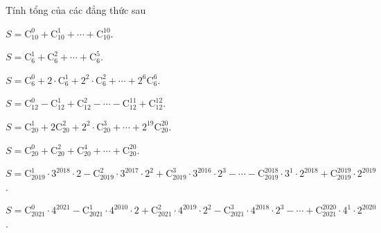 \begin{bt}%
	Tính  tổng của các đẳng thức sau
	\begin{listEX}
		 \item $S=\mathrm{C}_{10}^0+\mathrm{C}_{10}^1+\cdots+\mathrm{C}_{10}^{10}$.
		\item $S=\mathrm{C}_6^1+\mathrm{C}_6^2+\cdots+\mathrm{C}_6^5$. 
		\item $S=\mathrm{C}_6^0+2  \cdot \mathrm{C}_6^1+2^2 \cdot \mathrm{C}_6^2+\cdots+2^6 \mathrm{C}_6^6$.
		\item $S=\mathrm{C}_{12}^0-\mathrm{C}_{12}^1+\mathrm{C}_{12}^2-\cdots-\mathrm{C}_{12}^{11}+\mathrm{C}_{12}^{12}$. 
		\item $S=\mathrm{C}_{20}^1+2 \mathrm{C}_{20}^2+2^2  \cdot \mathrm{C}_{20}^3+\cdots+2^{19} \mathrm{C}_{20}^{20}$.
		 \item $S=\mathrm{C}_{20}^0+\mathrm{C}_{20}^2+\mathrm{C}_{20}^4+\cdots+\mathrm{C}_{20}^{20}$.
		\item $S=\mathrm{C}_{2019}^1 \cdot 3^{2018} \cdot 2-\mathrm{C}_{2019}^2 \cdot 3^{2017} \cdot 2^2+\mathrm{C}_{2019}^3  \cdot 3^{2016} \cdot 2^3-\cdots-\mathrm{C}_{2019}^{2018} \cdot 3^1 \cdot 2^{2018}+\mathrm{C}_{2019}^{2019} \cdot 2^{2019}$.
		\item $S=\mathrm{C}_{2021}^0 \cdot 4^{2021}-\mathrm{C}_{2021}^1 \cdot 4^{2010} \cdot 2+\mathrm{C}_{2021}^2 \cdot 4^{2019} \cdot  2^2-\mathrm{C}_{2021}^3 \cdot 4^{2018} \cdot 2^3-\cdots+\mathrm{C}_{2021}^{2020} \cdot 4^1 \cdot 2^{2020}$.
	\end{listEX}
\end{bt}
